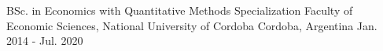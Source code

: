 

\begin{cventries}

  \cventry
	{BSc. in Economics with Quantitative Methods Specialization} %
 	{Faculty of Economic Sciences, National University of Cordoba} %
     	{Cordoba, Argentina} %
	{}
	{Jan. 2014 - Jul. 2020} %
\end{cventries}
